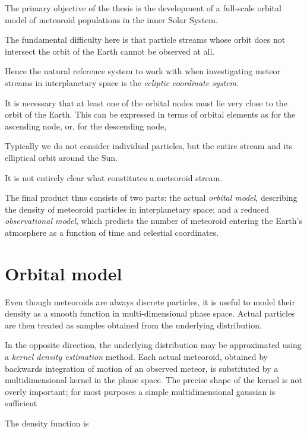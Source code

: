 The primary objective of the thesis is the development of a full-scale orbital model of meteoroid populations
in the inner Solar System.

The fundamental difficulty here is that particle streams whose orbit does not intersect the orbit of the Earth
cannot be observed at all.

Hence the natural reference system to work with when investigating meteor streams in interplanetary space
is the \emph{ecliptic coordinate system}.


It is necessary that at least one of the orbital nodes must lie very close to the orbit of the Earth.
This can be expressed in terms of orbital elements as
for the ascending node, or, for the descending node,

Typically we do not consider individual particles, but the entire stream and its elliptical orbit around the Sun.

It is not entirely clear what constitutes a meteoroid stream.


The final product thus consists of two parts: the actual \emph{orbital model},
describing the density of meteoroid particles in interplanetary space;
and a reduced \emph{observational model}, which predicts the number of meteoroid
entering the Earth's atmosphere as a function of time and celestial coordinates.

\section{Orbital model} \label{po}

    Even though meteoroids are always discrete particles, it is useful to model their density as a smooth
    function in multi-dimensional phase space.
    Actual particles are then treated as samples obtained from the underlying distribution.

    In the opposite direction, the underlying distribution may be approximated using a \emph{kernel density estimation} method.
    Each actual meteoroid, obtained by backwards integration of motion of an observed meteor,
    is substituted by a multidimensional kernel in the phase space. The precise shape of the kernel
    is not overly important; for most purposes a simple multidimensional gaussian is sufficient \cite{...}



    The density function is 
    \eqn{eq:po-rv}{
        \varrho(\vec{r}, \vec{v}, t) \in \left[0, \infty\right).
    }

